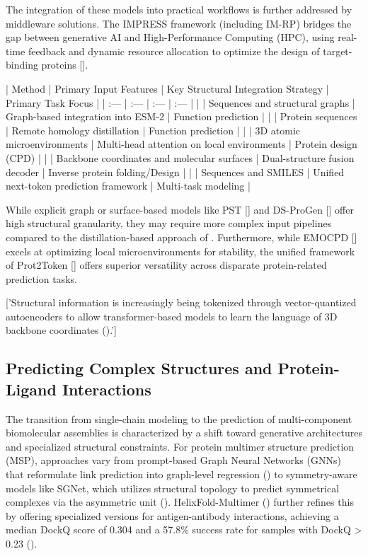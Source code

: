 \documentclass[11pt]{article}
\begin{document}
The integration of these models into practical workflows is further addressed by middleware solutions. The IMPRESS framework (including IM-RP) bridges the gap between generative AI and High-Performance Computing (HPC), using real-time feedback and dynamic resource allocation to optimize the design of target-binding proteins [\citep{2510.06396}].

| Method | Primary Input Features | Key Structural Integration Strategy | Primary Task Focus |
| :--- | :--- | :--- | :--- |
| \citep{2401.14819} | Sequences and structural graphs | Graph-based integration into ESM-2 | Function prediction |
| \citep{2402.05856} | Protein sequences | Remote homology distillation | Function prediction |
| \citep{2410.21069} | 3D atomic microenvironments | Multi-head attention on local environments | Protein design (CPD) |
| \citep{2505.12511} | Backbone coordinates and molecular surfaces | Dual-structure fusion decoder | Inverse protein folding/Design |
| \citep{2505.20589} | Sequences and SMILES | Unified next-token prediction framework | Multi-task modeling |

While explicit graph or surface-based models like PST [\citep{2401.14819}] and DS-ProGen [\citep{2505.12511}] offer high structural granularity, they may require more complex input pipelines compared to the distillation-based approach of \citep{2402.05856}. Furthermore, while EMOCPD [\citep{2410.21069}] excels at optimizing local microenvironments for stability, the unified framework of Prot2Token [\citep{2505.20589}] offers superior versatility across disparate protein-related prediction tasks.

['Structural information is increasingly being tokenized through vector-quantized autoencoders to allow transformer-based models to learn the language of 3D backbone coordinates (\citep{2405.15840}).']
\subsection{Predicting Complex Structures and Protein-Ligand Interactions}

The transition from single-chain modeling to the prediction of multi-component biomolecular assemblies is characterized by a shift toward generative architectures and specialized structural constraints. For protein multimer structure prediction (MSP), approaches vary from prompt-based Graph Neural Networks (GNNs) that reformulate link prediction into graph-level regression (\citep{2402.18813}) to symmetry-aware models like SGNet, which utilizes structural topology to predict symmetrical complexes via the asymmetric unit (\citep{2403.04395}). HelixFold-Multimer (\citep{2404.10260}) further refines this by offering specialized versions for antigen-antibody interactions, achieving a median DockQ score of 0.304 and a 57.8\% success rate for samples with DockQ > 0.23 (\citep{2404.10260}).
\end{document}
